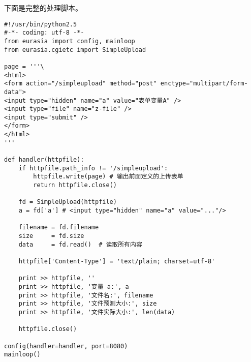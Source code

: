 \documentclass{manual}
\begin{document}
下面是完整的处理脚本。

\begin{verbatim}
#!/usr/bin/python2.5
#-*- coding: utf-8 -*-
from eurasia import config, mainloop
from eurasia.cgietc import SimpleUpload

page = '''\
<html>
<form action="/simpleupload" method="post" enctype="multipart/form-data">
<input type="hidden" name="a" value="表单变量A" />
<input type="file" name="z-file" />
<input type="submit" />
</form>
</html>
'''

def handler(httpfile):
	if httpfile.path_info != '/simpleupload':
		httpfile.write(page) # 输出前面定义的上传表单
		return httpfile.close()

	fd = SimpleUpload(httpfile)
	a = fd['a'] # <input type="hidden" name="a" value="..."/>

	filename = fd.filename
	size     = fd.size
	data     = fd.read()  # 读取所有内容

	httpfile['Content-Type'] = 'text/plain; charset=utf-8'

	print >> httpfile, ''
	print >> httpfile, '变量 a:', a
	print >> httpfile, '文件名:', filename
	print >> httpfile, '文件预测大小:', size
	print >> httpfile, '文件实际大小:', len(data)

	httpfile.close()

config(handler=handler, port=8080)
mainloop()
\end{verbatim}




\end{document}
